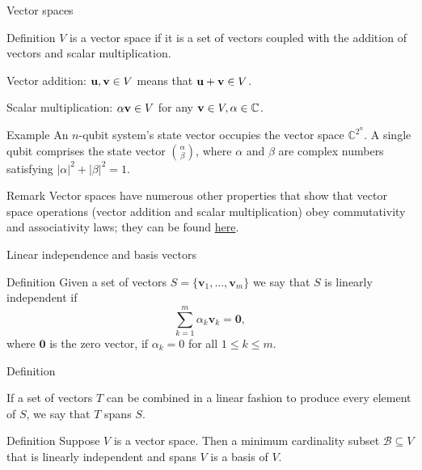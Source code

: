 \documentclass{beamer}
\newcommand{\C}{\mathbb{C}}
\begin{document}
\begin{frame}{Vector spaces}

\begin{block}{Definition}
$V$ is a vector space if it is a set of vectors coupled with the addition of vectors and scalar multiplication.

Vector addition: $\textbf u,\textbf v\in V$ means that $\textbf u+ \textbf v \in V$.

Scalar multiplication: $\alpha \textbf v \in V$ for any $\textbf v \in V,\alpha \in \C$.
\end{block}

\begin{block}{Example}
An $n$-qubit system's state vector occupies the vector space $\C^{2^n}$. A single qubit comprises the state vector $\binom{\alpha}{\beta}$, where $\alpha$ and $\beta$ are complex numbers satisfying $|\alpha|^2+|\beta|^2=1$.
\end{block}

\begin{block}{Remark}
    Vector spaces have numerous other properties that show that vector space operations (vector addition and scalar multiplication) obey commutativity and associativity laws; they can be found \href{http://linear.ups.edu/html/section-VS.html}{here}.
\end{block}

\end{frame}

\begin{frame}{Linear independence and basis vectors}

\begin{block}{Definition}
    Given a set of vectors $S=\{\textbf{v}_1,\ldots, \textbf{v}_m\}$ we say that $S$ is linearly independent if $$ \sum_{k=1}^m \alpha_k \textbf{v}_k = \textbf{0}, $$ where $\textbf{0}$ is the zero vector, if $\alpha_k = 0$ for all $1 \leq k \leq m.$
\end{block}

\begin{block}{Definition}

If a set of vectors $T$ can be combined in a linear fashion to produce every element of $S$, we say that $T$ spans $S$.

\end{block}

\begin{block}{Definition}
Suppose $V$ is a vector space. Then a minimum cardinality subset $\mathcal{B} \subseteq V$ that is linearly independent and spans $V$ is a basis of $V$.
\end{block}
    
\end{frame}
\end{document}
